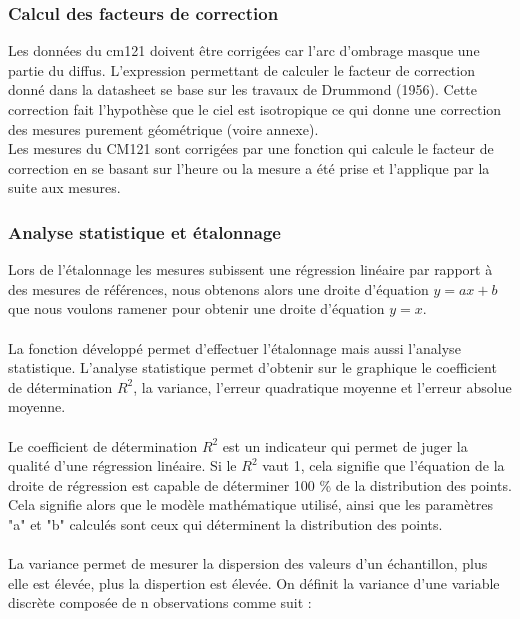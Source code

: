 \documentclass[12pt,a4paper]{article}
\begin{document}
\begin{flushleft}
\subsubsection{Calcul des facteurs de correction}

Les données du cm121 doivent être corrigées car l'arc d'ombrage masque une partie du diffus. L'expression permettant de calculer le facteur de correction donné dans la datasheet se base sur les travaux de Drummond (1956). Cette correction fait l'hypothèse que le ciel est isotropique ce qui donne une correction des mesures purement géométrique (voire annexe).\\

Les mesures du CM121 sont corrigées par une fonction qui calcule le facteur de correction en se basant sur l'heure ou la mesure a été prise et l'applique par la suite aux mesures.

\subsubsection{Analyse statistique et étalonnage}

Lors de l'étalonnage les mesures subissent une régression linéaire par rapport à des mesures de références, nous obtenons alors une droite d'équation $y = ax + b$ que nous voulons ramener pour obtenir une droite d'équation $y = x$.\\
~\\
La fonction développé permet d'effectuer l'étalonnage mais aussi l'analyse statistique. L'analyse statistique permet d'obtenir sur le graphique le coefficient de détermination $R^2$, la variance, l'erreur quadratique moyenne et l'erreur absolue moyenne.\\
~\\
Le coefficient de détermination $R^2$ est un indicateur qui permet de juger la qualité d’une régression linéaire. Si le $R^2$ vaut 1, cela signifie que l’équation de la droite de régression est capable de déterminer 100 \% de la distribution des points. Cela signifie alors que le modèle mathématique utilisé, ainsi que les paramètres "a" et "b" calculés sont ceux qui déterminent la distribution des points.\\
~~\\
La variance permet de mesurer la dispersion des valeurs d'un échantillon, plus elle est élevée, plus la dispertion est élevée. On définit la variance d'une variable discrète composée de n observations comme suit :\\


\end{flushleft}
\end{document}
